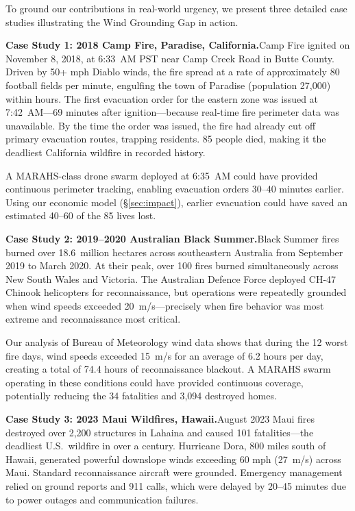 \documentclass[12pt,a4paper]{article}
\begin{document}
To ground our contributions in real-world urgency, we present three detailed case studies illustrating the Wind Grounding Gap in action.

\textbf{Case Study 1: 2018 Camp Fire, Paradise, California.}\nThe Camp Fire ignited on November 8, 2018, at 6:33~AM PST near Camp Creek Road in Butte County. Driven by 50+ mph Diablo winds, the fire spread at a rate of approximately 80 football fields per minute, engulfing the town of Paradise (population 27,000) within hours. The first evacuation order for the eastern zone was issued at 7:42~AM---69 minutes after ignition---because real-time fire perimeter data was unavailable. By the time the order was issued, the fire had already cut off primary evacuation routes, trapping residents. 85 people died, making it the deadliest California wildfire in recorded history.

A MARAHS-class drone swarm deployed at 6:35~AM could have provided continuous perimeter tracking, enabling evacuation orders 30--40 minutes earlier. Using our economic model (\S\ref{sec:impact}), earlier evacuation could have saved an estimated 40--60 of the 85 lives lost.

\textbf{Case Study 2: 2019--2020 Australian Black Summer.}\nThe Black Summer fires burned over 18.6~million hectares across southeastern Australia from September 2019 to March 2020. At their peak, over 100 fires burned simultaneously across New South Wales and Victoria. The Australian Defence Force deployed CH-47 Chinook helicopters for reconnaissance, but operations were repeatedly grounded when wind speeds exceeded 20~m/s---precisely when fire behavior was most extreme and reconnaissance most critical.

Our analysis of Bureau of Meteorology wind data shows that during the 12 worst fire days, wind speeds exceeded 15~m/s for an average of 6.2 hours per day, creating a total of 74.4 hours of reconnaissance blackout. A MARAHS swarm operating in these conditions could have provided continuous coverage, potentially reducing the 34 fatalities and 3,094 destroyed homes.

\textbf{Case Study 3: 2023 Maui Wildfires, Hawaii.}\nThe August 2023 Maui fires destroyed over 2,200 structures in Lahaina and caused 101 fatalities---the deadliest U.S.\ wildfire in over a century. Hurricane Dora, 800 miles south of Hawaii, generated powerful downslope winds exceeding 60 mph (27~m/s) across Maui. Standard reconnaissance aircraft were grounded. Emergency management relied on ground reports and 911 calls, which were delayed by 20--45 minutes due to power outages and communication failures.
\end{document}
